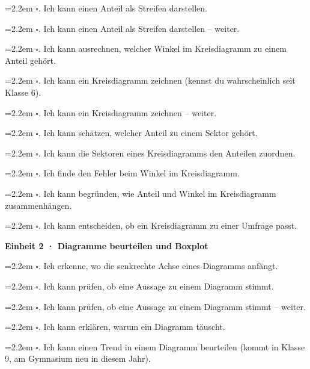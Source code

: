 \noindent\hangindent=2.2em $\square$. Ich kann einen Anteil als Streifen darstellen.\par
\noindent\hangindent=2.2em $\square$. Ich kann einen Anteil als Streifen darstellen – weiter.\par
\noindent\hangindent=2.2em $\square$. Ich kann ausrechnen, welcher Winkel im Kreisdiagramm zu einem Anteil gehört.\par
\noindent\hangindent=2.2em $\square$. Ich kann ein Kreisdiagramm zeichnen (kennst du wahrscheinlich seit Klasse 6).\par
\noindent\hangindent=2.2em $\square$. Ich kann ein Kreisdiagramm zeichnen – weiter.\par
\noindent\hangindent=2.2em $\square$. Ich kann schätzen, welcher Anteil zu einem Sektor gehört.\par
\noindent\hangindent=2.2em $\square$. Ich kann die Sektoren eines Kreisdiagramms den Anteilen zuordnen.\par
\noindent\hangindent=2.2em $\square$. Ich finde den Fehler beim Winkel im Kreisdiagramm.\par
\noindent\hangindent=2.2em $\square$. Ich kann begründen, wie Anteil und Winkel im Kreisdiagramm zusammenhängen.\par
\noindent\hangindent=2.2em $\square$. Ich kann entscheiden, ob ein Kreisdiagramm zu einer Umfrage passt.\par
\par\medskip\noindent\textbf{Einheit 2 · Diagramme beurteilen und Boxplot}\par\smallskip
\noindent\hangindent=2.2em $\square$. Ich erkenne, wo die senkrechte Achse eines Diagramms anfängt.\par
\noindent\hangindent=2.2em $\square$. Ich kann prüfen, ob eine Aussage zu einem Diagramm stimmt.\par
\noindent\hangindent=2.2em $\square$. Ich kann prüfen, ob eine Aussage zu einem Diagramm stimmt – weiter.\par
\noindent\hangindent=2.2em $\square$. Ich kann erklären, warum ein Diagramm täuscht.\par
\noindent\hangindent=2.2em $\square$. Ich kann einen Trend in einem Diagramm beurteilen (kommt in Klasse 9, am Gymnasium neu in diesem Jahr).\par
